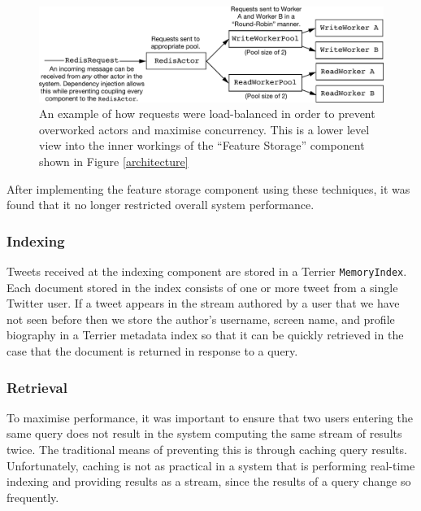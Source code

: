 \documentclass{l4proj}
\newcommand{\code}[1]{\texttt{#1}}
\begin{document}
\begin{figure}
\centering
\includegraphics[scale=0.7]{loadbalancing.pdf}
\caption{An example of how requests were load-balanced in order to prevent overworked actors and maximise concurrency. This is a lower level view into the inner workings of the ``Feature Storage'' component shown in Figure \ref{architecture}}
\label{loadbalancing}
\end{figure}
        
        
        After implementing the feature storage component using these techniques, it was found that it no longer restricted overall system performance.

        \subsubsection{Indexing}
        Tweets received at the indexing component are stored in a Terrier \code{MemoryIndex}. Each document stored in the index consists of one or more tweet from a single Twitter user. If a tweet appears in the stream authored by a user that we have not seen before then we store the author's username, screen name, and profile biography in a Terrier metadata index so that it can be quickly retrieved in the case that the document is returned in response to a query.        
        
        \subsubsection{Retrieval}
        
        To maximise performance, it was important to ensure that two users entering the same query does not result in the system computing the same stream of results twice. The traditional means of preventing this is through caching query results. Unfortunately, caching is not as practical in a system that is performing real-time indexing and providing results as a stream, since the results of a query change so frequently.
        
\end{document}
